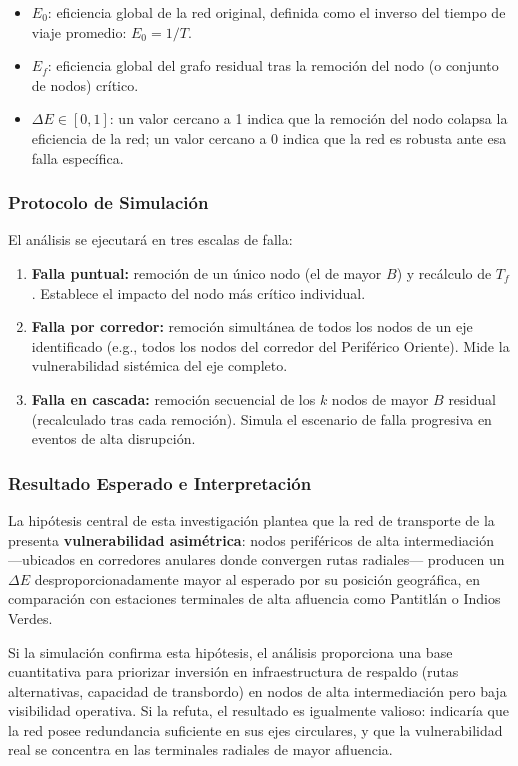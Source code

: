 \begin{itemize}
    \item $E_0$: eficiencia global de la red original, definida como el inverso
    del tiempo de viaje promedio: $E_0 = 1/T$.
    \item $E_f$: eficiencia global del grafo residual tras la remoción del nodo
    (o conjunto de nodos) crítico.
    \item $\Delta E \in [0, 1]$: un valor cercano a 1 indica que la remoción
    del nodo colapsa la eficiencia de la red; un valor cercano a 0 indica que la
    red es robusta ante esa falla específica.
\end{itemize}

\subsubsection{Protocolo de Simulación}
\label{subsubsec:protocolo-simulacion}

El análisis se ejecutará en tres escalas de falla:

\begin{enumerate}
    \item \textbf{Falla puntual:} remoción de un único nodo (el de mayor $B$)
    y recálculo de $T_f$. Establece el impacto del nodo más crítico individual.
    \item \textbf{Falla por corredor:} remoción simultánea de todos los nodos
    de un eje identificado (e.g., todos los nodos del corredor del Periférico
    Oriente). Mide la vulnerabilidad sistémica del eje completo.
    \item \textbf{Falla en cascada:} remoción secuencial de los $k$ nodos de
    mayor $B$ residual (recalculado tras cada remoción). Simula el escenario de
    falla progresiva en eventos de alta disrupción.
\end{enumerate}

\subsubsection{Resultado Esperado e Interpretación}
\label{subsubsec:deltae-resultado-esperado}

La hipótesis central de esta investigación plantea que la red de transporte de
la \zmvm presenta \textbf{vulnerabilidad asimétrica}: nodos periféricos de alta
intermediación —ubicados en corredores anulares donde convergen rutas radiales—
producen un $\Delta E$ desproporcionadamente mayor al esperado por su posición
geográfica, en comparación con estaciones terminales de alta afluencia como
Pantitlán o Indios Verdes.

Si la simulación confirma esta hipótesis, el análisis proporciona una base
cuantitativa para priorizar inversión en infraestructura de respaldo (rutas
alternativas, capacidad de transbordo) en nodos de alta intermediación pero baja
visibilidad operativa. Si la refuta, el resultado es igualmente valioso:
indicaría que la red posee redundancia suficiente en sus ejes circulares, y que
la vulnerabilidad real se concentra en las terminales radiales de mayor
afluencia.
